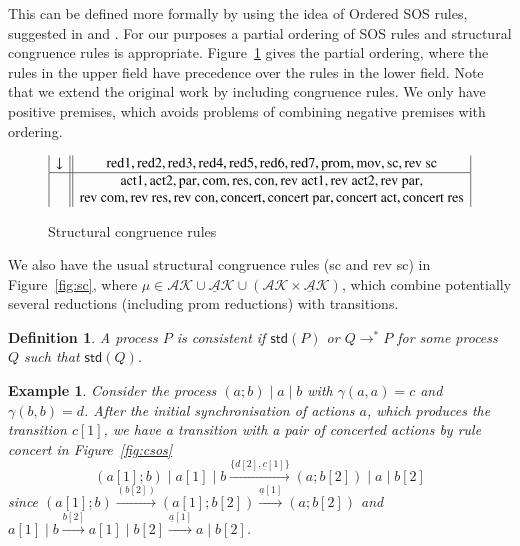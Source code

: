 \documentclass[review]{elsarticle}
\newcommand{\paral}{\; \vert \;}
\newcommand{\mAK}{\mathcal{AK}}
\newcommand{\umAK}{\underline{\mathcal{A}}\mathcal{K}}
\newcommand{\rom}[1]{\mbox{\rm{#1}}}
\newcommand{\std}[1]{\mathsf{std}(#1)}
\newtheorem{definition}{Definition}
\newtheorem{example}{Example}
\begin{document}
This can be defined more formally by using the idea of Ordered SOS rules, suggested in \cite{irek2002} and \cite{mousavi}. For our purposes a partial ordering of SOS rules and structural congruence rules is appropriate. Figure~\ref{fig:osos} gives the partial ordering, where the rules in the upper field have precedence over the rules in the lower field. Note that we extend the original work by including congruence rules. We only have positive premises, which avoids problems of combining negative premises with ordering.

\begin{figure}
\[
\begin{array}{|c||c|}
\downarrow & \rom{red1}, \rom{red2}, \rom{red3}, \rom{red4}, \rom{red5}, \rom{red6}, \rom{red7}, \rom{prom}, \rom{mov}, \rom{sc}, \rom{rev sc} \\
\hline
& \rom{act1}, \rom{act2}, \rom{par}, \rom{com}, \rom{res}, \rom{con}, \rom{rev act1}, \rom{rev act2}, \rom{rev par}, \\
& \rom{rev com}, \rom{rev res}, \rom{rev con}, \rom{concert}, \rom{concert par}, \rom{concert act}, \rom{concert res} 
\end{array}
\] 
\caption{Structural congruence rules} \label{fig:osos}
\end{figure}

We also have the usual structural congruence rules 
(sc and rev sc) in Figure~\ref{fig:sc}, where $\mu \in \mAK\cup \umAK \cup (\mAK\times \umAK) $, 
which combine potentially several reductions (including prom reductions) with transitions.

\begin{definition} \normalfont A process $P$ is \emph{consistent} if $\std{P}$ or $Q \rightarrow^* P$ 
for some process $Q$ such that $\std{Q}$.
\end{definition}

\begin{example}\label{ex:examp1}
Consider the process $(a;b) \paral a \paral b$ with $\gamma(a,a)=c$ and $\gamma(b,b)=d$. After the
initial synchronisation of actions $a$, which produces the transition $c[1]$, we have a transition 
with a pair of concerted actions by rule concert in Figure~\ref{fig:csos}
$$(a[1];b) \paral a[1] \paral  b \xrightarrow{\{d[2], \underline{c}[1]\}} 
  (a;b[2])\paral a \paral b[2]$$
since $(a[1];b) \xrightarrow{(b[2])} (a[1];b[2])\xrightarrow{\underline{a}[1]} (a;b[2])$ 
and $a[1] \paral b \xrightarrow{b[2]} a[1] \paral b[2] \xrightarrow{\underline{a}[1]} a \paral b[2]$.
\end{example}
\end{document}
